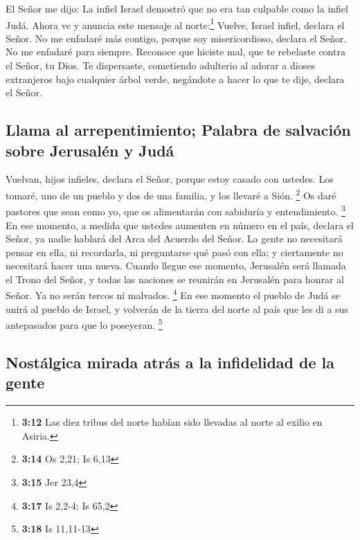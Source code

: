  El Señor me dijo: La infiel Israel demostró que no era
tan culpable como la infiel Judá.  Ahora ve y anuncia
este mensaje al norte:\footnote{\textbf{3:12} Las diez tribus del norte
  habían sido llevadas al norte al exilio en Asiria.} Vuelve, Israel
infiel, declara el Señor. No me enfadaré más contigo, porque soy
misericordioso, declara el Señor. No me enfadaré para siempre.
 Reconoce que hiciste mal, que te rebelaste contra el
Señor, tu Dios. Te dispersaste, cometiendo adulterio al adorar a dioses
extranjeros bajo cualquier árbol verde, negándote a hacer lo que te
dije, declara el Señor.

\hypertarget{llama-al-arrepentimiento-palabra-de-salvaciuxf3n-sobre-jerusaluxe9n-y-juduxe1}{%
\subsection{Llama al arrepentimiento; Palabra de salvación sobre
Jerusalén y
Judá}\label{llama-al-arrepentimiento-palabra-de-salvaciuxf3n-sobre-jerusaluxe9n-y-juduxe1}}

 Vuelvan, hijos infieles, declara el Señor, porque estoy
casado con ustedes. Los tomaré, uno de un pueblo y dos de una familia, y
los llevaré a Sión. \footnote{\textbf{3:14} Os 2,21; Is 6,13}
 Os daré pastores que sean como yo, que os alimentarán
con sabiduría y entendimiento. \footnote{\textbf{3:15} Jer 23,4}
 En ese momento, a medida que ustedes aumenten en número
en el país, declara el Señor, ya nadie hablará del Arca del Acuerdo del
Señor. La gente no necesitará pensar en ella, ni recordarla, ni
preguntarse qué pasó con ella; y ciertamente no necesitará hacer una
nueva.  Cuando llegue ese momento, Jerusalén será llamada
el Trono del Señor, y todas las naciones se reunirán en Jerusalén para
honrar al Señor. Ya no serán tercos ni malvados. \footnote{\textbf{3:17}
  Is 2,2-4; Is 65,2}  En ese momento el pueblo de Judá se
unirá al pueblo de Israel, y volverán de la tierra del norte al país que
les di a sus antepasados para que lo poseyeran. \footnote{\textbf{3:18}
  Is 11,11-13}

\hypertarget{nostuxe1lgica-mirada-atruxe1s-a-la-infidelidad-de-la-gente}{%
\subsection{Nostálgica mirada atrás a la infidelidad de la
gente}\label{nostuxe1lgica-mirada-atruxe1s-a-la-infidelidad-de-la-gente}}

